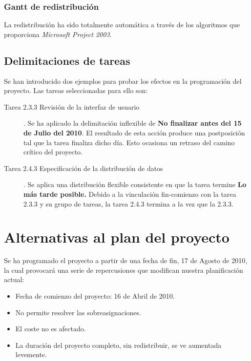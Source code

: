 \documentclass[11pt,a4paper,spanish,twoside]{book}
\begin{document}

\subsection{Gantt de redistribución}
La redistribución ha sido totalmente automática a través de los algoritmos
que proporciona \emph{Microsoft Project 2003}.

\section{Delimitaciones de tareas}
Se han introducido dos ejemplos para probar los efectos en la programación
del proyecto. Las tareas seleccionadas para ello son: 
\begin{description}
\item [Tarea 2.3.3 Revisión de la interfaz de usuario].
 Se ha aplicado la delimitación inflexible de \textbf{No
   finalizar antes del 15 de Julio del 2010}. El resultado de esta acción
 produce una postposición tal que la tarea finaliza dicho día. Esto ocasiona
 un retraso del camino crítico del proyecto.

\item [Tarea 2.4.3 Especificación de la distribución de datos].
 Se aplica una distribución flexible consistente en que la tarea
 termine \textbf{Lo más tarde posible.} Debido a la vinculación fin-comienzo
 con la tarea 2.3.3 y su grupo de tareas, la tarea 2.4.3 termina a la vez que
 la 2.3.3.
\end{description}

\chapter{Alternativas al plan del proyecto}
\newpage
Se ha programado el proyecto a partir de una fecha de fin, 17 de Agosto de
2010, la cual provocará una serie de repercusiones que modifican nuestra
planificación actual: 
\begin{itemize}
\item Fecha de comienzo del proyecto: 16 de Abril de 2010.
\item No permite resolver las sobreasignaciones.
\item El coste no es afectado.
\item La duración del proyecto completo, sin redistribuir, se ve aumentada
  levemente.
\end{itemize}
\end{document}
